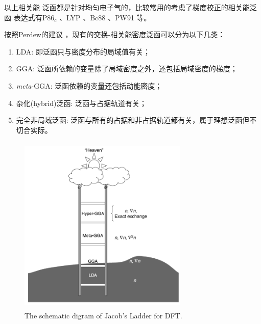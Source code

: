 {以上相关能%
{泛函}都是针对均匀电子气的，比较常用的考虑了梯度校正的相关能泛函%
{表达}式有P86$_c$%
、LYP%
、Bc88%
、PW91%
等。

按照Perdew的建议%
，现有的交换-相关能密度泛函可以分为以下几类：
\begin{enumerate}
  \item LDA: 即泛函只与密度分布的局域值有关；
  \item GGA: 泛函所依赖的变量除了局域密度之外，还包括局域密度的梯度；
  \item \textit{meta}-GGA: 泛函依赖的变量还包括动能密度；
  \item {杂化(hybrid)泛函}: 泛函与占据轨道有关；
  \item 完全非局域泛函: 泛函与所有的占据和非占据轨道都有关，属于理想泛函但不%
{切合实际}。
\end{enumerate}
\begin{figure}[!h]
\centering
\includegraphics[height=3.4in,width=3.18in,viewport=10 5 680 700,clip]{Figures/Jacobi-ladder.png}
\caption{\small The schematic digram of Jacob's Ladder for DFT.\cite{Perdew-Schmidt_2001,Science298-759_2002}}
\label{Fig:Jacob-Ladder}
\end{figure}

}

